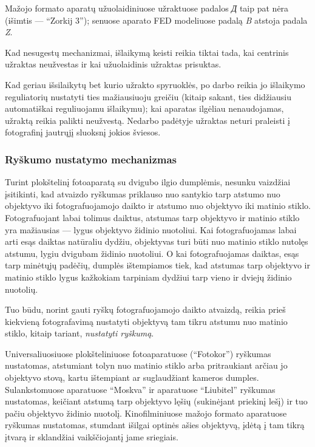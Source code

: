 \documentclass{book}
\begin{document}
					Mažojo formato aparatų užuolaidiniuose užraktuose padalos \textit{\foreignlanguage{russian}{Д}} taip pat nėra (išimtis --- ``Zorkij 3''); senuose aparato FED modeliuose padalą \textit{B} atstoja padala \textit{Z}.

					Kad nesugestų mechanizmai, išlaikymą keisti reikia tiktai tada, kai centrinis užraktas neužvestas ir kai užuolaidinis užraktas prisuktas.

					Kad geriau išsilaikytų bet kurio užrakto spyruoklės, po darbo reikia jo išlaikymo reguliatorių nustatyti ties mažiausiuoju greičiu (kitaip sakant, ties didžiausiu automatiškai reguliuojamu išlaikymu); kai aparatas ilgėliau nenaudojamas, užraktą reikia palikti neužvestą. Nedarbo padėtyje užraktas neturi praleisti į fotografinį jautrųjį sluoksnį jokios šviesos.
				\subsubsection*{Ryškumo nustatymo mechanizmas}
					Turint plokštelinį fotoaparatą su dvigubo ilgio dumplėmis, nesunku vaizdžiai įsitikinti, kad atvaizdo ryškumas priklauso nuo santykio tarp atstumo nuo objektyvo iki fotografuojamojo daikto ir atstumo nuo objektyvo iki matinio stiklo. Fotografuojant labai tolimus daiktus, atstumas tarp objektyvo ir matinio stiklo yra mažiausias --- lygus objektyvo židinio nuotoliui. Kai fotografuojamas labai arti esąs daiktas natūraliu dydžiu, objektyvas turi būti nuo matinio stiklo nutolęs atstumu, lygiu dvigubam židinio nuotoliui. O kai fotografuojamas daiktas, esąs tarp minėtųjų padėčių, dumplės ištempiamos tiek, kad atstumas tarp objektyvo ir matinio stiklo lygus kažkokiam tarpiniam dydžiui tarp vieno ir dviejų židinio nuotolių.

					Tuo būdu, norint gauti ryškų fotografuojamojo daikto atvaizdą, reikia prieš kiekvieną fotografavimą nustatyti objektyvą tam tikru atstumu nuo matinio stiklo, kitaip tariant, \textit{nustatyti ryškumą}.

					Universaliuosiuose plokšteliniuose fotoaparatuose (``Fotokor'') ryškumas nustatomas, atstumiant tolyn nuo matinio stiklo arba pritraukiant arčiau jo objektyvo stovą, kartu ištempiant ar suglaudžiant kameros dumples. Sulankstomuose aparatuose ``Moskva'' ir aparatuose ``Liubitel'' ryškumas nustatomas, keičiant atstumą tarp objektyvo lęšių (sukinėjant priekinį lešį) ir tuo pačiu objektyvo židinio nuotolį. Kinofilminiuose mažojo formato aparatuose ryškumas nustatomas, stumdant išilgai optinės ašies objektyvą, įdėtą į tam tikrą įtvarą ir sklandžiai vaikščiojantį jame sriegiais.
\end{document}
